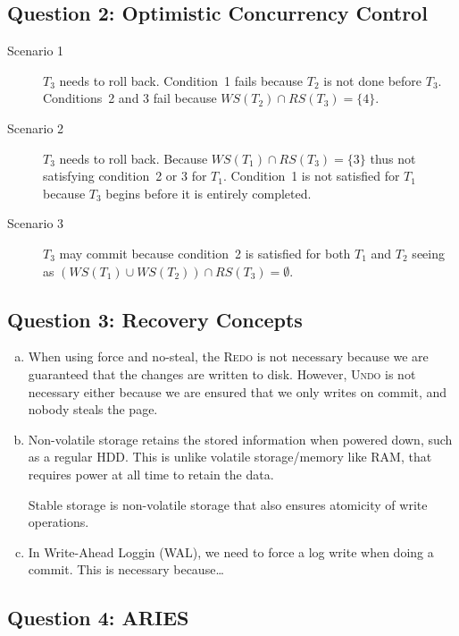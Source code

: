 \documentclass[a4paper]{article}
\begin{document}
\subsection{Question 2: Optimistic Concurrency Control}

\begin{description}
    \item[Scenario 1] $T_3$ needs to roll back. Condition~1 fails because $T_2$
        is not done before $T_3$. Conditions~2 and 3 fail because $WS(T_2) \cap
        RS(T_3) = \{4\}$.
    \item[Scenario 2] $T_3$ needs to roll back. Because $WS(T_1) \cap RS(T_3) =
        \{3\}$ thus not satisfying condition~2 or 3 for $T_1$. Condition~1 is
        not satisfied for $T_1$ because $T_3$ begins before it is entirely
        completed.
    \item[Scenario 3] $T_3$ may commit because condition~2 is satisfied for
        both $T_1$ and $T_2$ seeing as $(WS(T_1) \cup WS(T_2)) \cap RS(T_3) =
        \emptyset$.
\end{description}

\subsection{Question 3: Recovery Concepts}

\begin{enumerate}[(a)]
    \item When using force and no-steal, the \textsc{Redo} is not necessary
        because we are guaranteed that the changes are written to disk.
        However, \textsc{Undo} is not necessary either because we are ensured
        that we only writes on commit, and nobody steals the page.
    \item Non-volatile storage retains the stored information when powered
        down, such as a regular HDD\@. This is unlike volatile storage/memory
        like RAM, that requires power at all time to retain the data.

        Stable storage is non-volatile storage that also ensures atomicity of
        write operations.
    \item In Write-Ahead Loggin (WAL), we need to force a log write when doing
        a commit. This is necessary because\ldots %
\end{enumerate}

\subsection{Question 4: ARIES}
\end{document}
